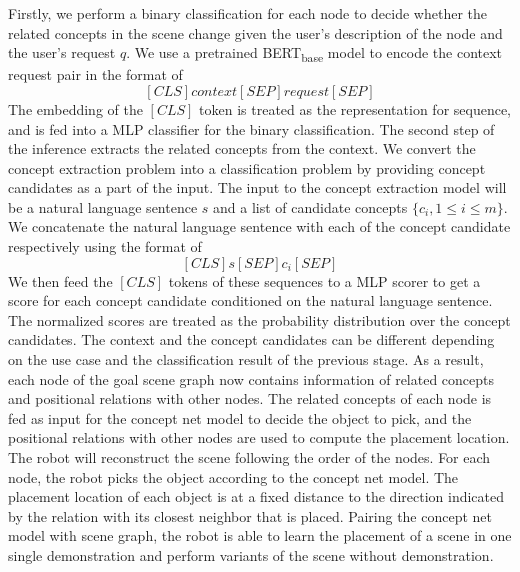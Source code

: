 Firstly, we perform a binary classification for each node to decide whether the related concepts in the scene change given the user's description of the node and the user's request $q$. 
We use a pretrained BERT\textsubscript{base} model to encode the context request pair in the format of \\
$$[CLS] context [SEP] request [SEP]$$
The embedding of the $[CLS]$ token is treated as the representation for sequence, and is fed into a MLP classifier for the binary classification.
The second step of the inference extracts the related concepts from the context.
We convert the concept extraction problem into a classification problem by providing concept candidates as a part of the input.
The input to the concept extraction model will be a natural language sentence $s$ and a list of candidate concepts $\{c_i, 1\leq i \leq m\}$.
We concatenate the natural language sentence with each of the concept candidate respectively using the format of 
$$[CLS] s [SEP] c_i [SEP]$$
We then feed the $[CLS]$ tokens of these sequences to a MLP scorer to get a score for each concept candidate conditioned on the natural language sentence. 
The normalized scores are treated as the probability distribution over the concept candidates.
The context and the concept candidates can be different depending on the use case and the classification result of the previous stage.
As a result, each node of the goal scene graph now contains information of related concepts and positional relations with other nodes.
The related concepts of each node is fed as input for the concept net model to decide the object to pick, and the positional relations with other nodes are used to compute the placement location.
The robot will reconstruct the scene following the order of the nodes.
For each node, the robot picks the object according to the concept net model.
The placement location of each object is at a fixed distance to the direction indicated by the relation with its closest neighbor that is placed.
Pairing the concept net model with scene graph, the robot is able to learn the placement of a scene in one single demonstration and perform variants of the scene without demonstration.




